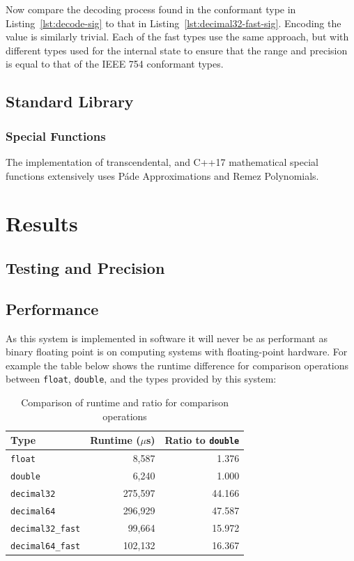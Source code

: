 \documentclass[acmsmall]{acmart}
\newcommand{\code}[1]{\texttt{#1}}
\begin{document}
Now compare the decoding process found in the conformant type in Listing~\ref{lst:decode-sig} to that in Listing~\ref{lst:decimal32-fast-sig}.
Encoding the value is similarly trivial.
Each of the fast types use the same approach, but with different types used for the internal state to ensure that the range and precision is equal to that of the IEEE 754 conformant types.

\subsection{Standard Library}

\subsubsection{Special Functions}

The implementation of transcendental, and C++17 mathematical special functions\cite{cppreference_special_functions}\cite{iso_cpp23} extensively uses Páde Approximations and Remez Polynomials.

\section{Results}
\subsection{Testing and Precision}
\subsection{Performance}

As this system is implemented in software it will never be as performant as binary floating point is on computing systems with floating-point hardware.
For example the table below shows the runtime difference for comparison operations between \code{float}, \code{double}, and the types provided by this system:

\begin{table}[h]
\centering
\begin{tabular}{|l|r|r|}
\hline
Type & Runtime ($\mu$s) & Ratio to \texttt{double} \\
\hline
\texttt{float} & 8,587 & 1.376 \\
\texttt{double} & 6,240 & 1.000 \\
\texttt{decimal32} & 275,597 & 44.166 \\
\texttt{decimal64} & 296,929 & 47.587 \\
\texttt{decimal32\_fast} & 99,664 & 15.972 \\
\texttt{decimal64\_fast} & 102,132 & 16.367 \\
\hline
\end{tabular}
\caption{Comparison of runtime and ratio for comparison operations}
\label{tab:comp-comparison}
\end{table}
\end{document}
